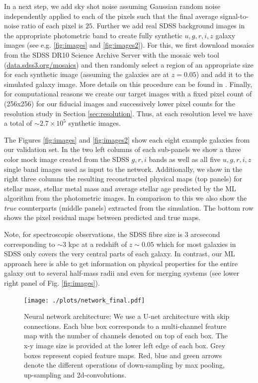 \documentclass[useAMS,usenatbib]{mnras}
\begin{document}
In a next step, we add sky shot noise assuming Gaussian random noise independently applied to each of the pixels such that the final average signal-to-noise ratio of each pixel is $25$. Further we add real SDSS background images in the appropriate photometric band to create fully synthetic $u,g,r,i,z$ galaxy images (see e.g. \ref{fig:images} and \ref{fig:images2}). For this, we first download mosaics from the SDSS DR10 \citep{Ahn2014} Science Archive Server with the mosaic web tool (\href{data.sdss3.org/mosaics}{data.sdss3.org/mosaics}) and then randomly select a region of an appropriate size for each synthetic image (assuming the galaxies are at $z = 0.05$) and add it to the simulated galaxy image. More details on this procedure can be found in \citep[][Section 2.]{Snyder2015}. Finally, for computational reasons we create our target images with a fixed pixel count of (256x256) for our fiducial images and successively lower pixel counts for the resolution study in Section \ref{sec:resolution}. Thus, at each resolution level we have a total of $\sim2.7 \times 10^5$ synthetic images. 

The Figures \ref{fig:images} and \ref{fig:images2} show each eight example galaxies from our validation set. In the two left columns of each sub-panels we show a three color mock image created from the SDSS $g,r,i$ bands as well as all five $u,g,r,i,z$ single band images used as input to the network. Additionally, we show in the right three columns the resulting reconstructed physical maps (top panels) for stellar mass, stellar metal mass and average stellar age predicted by the ML algorithm from the photometric images. In comparison to this we also show the \textit{true} counterparts (middle panels) extracted from the simulation. The bottom row shows the pixel residual maps between predicted and true maps.

Note, for spectroscopic observations, the SDSS fibre size is $3$ arcsecond corresponding to $\sim3$ kpc at a redshift of $z\sim0.05$ which for most galaxies in SDSS only covers the very central parts of each galaxy. In contrast, our ML approach here is able to get information on physical properties for the entire galaxy out to several half-mass radii and even for merging systems (see lower right panel of Fig. \ref{fig:images}).


\begin{figure}
\begin{center}
\texttt{[image: ./plots/network\_final.pdf]}
\end{center}
\vspace{-.35cm}
\caption{Neural network architecture: We use a U-net architecture with skip connections. Each blue box corresponds to a multi-channel feature map with the number of channels denoted on top of each box. The x-y image size is provided at the lower left edge of each box. Grey boxes represent copied feature maps. Red, blue and green arrows denote the different operations of down-sampling by max pooling, up-sampling and 2d-convolutions.}
\label{fig:network}
\end{figure}
\end{document}
